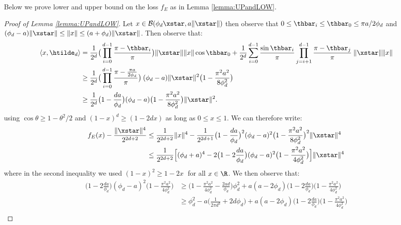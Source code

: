 Below we prove lower and upper bound on the loss $f_E$ as in Lemma \ref{lemma:UPandLOW}.

\begin{proof}[Proof of Lemma \ref{lemma:UPandLOW}]
	Let $x \in \mathcal{B}(\phi_d \xstar, a \|\xstar\|)$ then observe that $0 \leq \thbar_i \leq \thbar_0 \leq \pi a / 2 \phi_d$ and $(\phi_d - a) \|\xstar\| \leq  \|x \| \leq (a + \phi_d) \|\xstar\|$. 
	Then observe that:
	\[
	\begin{aligned}
	\langle x, \htilde_d \rangle &= \frac{1}{2^d}  \big(\prod_{i=0}^{d-1} \frac{\pi - \thbar_i}{\pi}\big) \|\xstar\| \| x\| \cos \thbar_0  + \frac{1}{2^d} \sum_{i=0}^{d-1} \frac{\sin \thbar_i}{\pi} \prod_{j=i+1}^{d-1} \frac{\pi - \thbar_j}{\pi} \:  \|\xstar\| \| x\| \\
	&\geq \frac{1}{2^d}  \big(\prod_{i=0}^{d-1} \frac{\pi -\frac{ \pi a}{2 \phi_d}}{\pi} \big) \:  (\phi_d - a)   \| \xstar \|^2   \big( 1 - \frac{\pi^2 a^2}{8 \phi_d^2}\big) \\
	&\geq \frac{1}{2^d}  \big( 1- \frac{d a}{\phi_d} \big)  (\phi_d - a)  \big( 1 - \frac{\pi^2 a^2}{8 \phi_d^2}\big) \| \xstar \|^2.
	\end{aligned}
	\] 
	using  $\cos \theta \geq 1 - \theta^2/2$ and $(1 - x)^d \geq (1 - 2 d x)$ as long as $0 \leq x \leq 1$. We can therefore write:
	\[
	\begin{aligned}
	f_E(x) - \frac{\|\xstar\|^4}{2^{2d+2}} &\leq \frac{1}{2^{2d+2}} \|x\|^4 - 
	\frac{1}{2^{2d+1}}  \big( 1- \frac{d a}{\phi_d} \big)^{2}  (\phi_d - a)^{2}  \big( 1 - \frac{\pi^2 a^2}{8 \phi_d^2}\big)^{2} \| \xstar \|^4 \\
	&\leq \frac{1}{2^{2d+2}} \Big[  (\phi_d + a)^4 - 2  \big( 1- 2 \frac{d a}{\phi_d} \big)  (\phi_d - a)^{2}  \big( 1 - \frac{\pi^2 a^2}{4 \phi_d^2}\big) \Big]  \| \xstar \|^4
	\end{aligned}
	\]
	where in the second inequality we used $(1 - x)^2 \geq 1 - 2x\;$ for all $x \in \R$. We then observe that:
	\[
	\begin{aligned}
		\big( 1- 2 \frac{d a}{\phi_d} \big)  (\phi_d - a)^{2}  \big( 1 - \frac{\pi^2 a^2}{4 \phi_d^2}\big) &\geq \big( 1 -\frac{\pi ^2 a^2}{4 \phi_d ^2}-\frac{2 a d}{\phi_d }\big) \phi_d^2 + a (a - 2 \phi_d)	\big( 1- 2 \frac{d a}{\phi_d} \big)   \big( 1 - \frac{\pi^2 a^2}{4 \phi_d^2}\big) \\
		&\geq \phi_d^2 -  a \big( \frac{1}{2 \pi d^3} +  {2 d \phi_d} \big) + a (a - 2 \phi_d) \big( 1- 2 \frac{d a}{\phi_d} \big)   \big( 1 - \frac{\pi^2 a^2}{4 \phi_d^2}\big)  \\

\end{aligned}\]
\end{proof}
